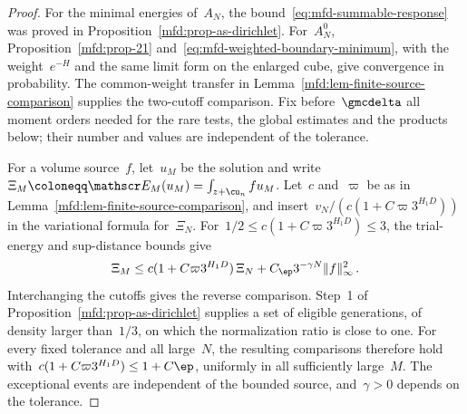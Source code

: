 \documentclass[11pt]{amsart}
\begin{document}
\begin{proof}
For the minimal energies of~$A_N$, the bound~\eqref{eq:mfd-summable-response} was proved in Proposition~\ref{mfd:prop-as-dirichlet}. For~$A_N^0$, Proposition~\ref{mfd:prop-21} and~\eqref{eq:mfd-weighted-boundary-minimum}, with the weight~$e^{-H}$ and the same limit form on the enlarged cube, give convergence in probability. The common-weight transfer in Lemma~\ref{mfd:lem-finite-source-comparison} supplies the two-cutoff comparison. Fix before~$\gmcdelta$ all moment orders needed for the rare tests, the global estimates and the products below; their number and values are independent of the tolerance.

\smallskip

For a volume source~$f$, let~$u_M$ be the solution and write~$\Xi_M\coloneqq \mathscr E_M(u_M)=\int_{z+\cu_n}fu_M$. Let~$c$ and~$\varpi$ be as in Lemma~\ref{mfd:lem-finite-source-comparison}, and insert~$v_N/(c(1+C\varpi3^{H_1D}))$ in the variational formula for~$\Xi_N$. For~$1/2\leq c(1+C\varpi3^{H_1D})\leq3$, the trial-energy and sup-distance bounds give
\begin{equation*}
	\Xi_M\leq c(1+C\varpi3^{H_1D})\,\Xi_N+C_\ep3^{-\gamma N}\|f\|_\infty^2\,.
\end{equation*}
Interchanging the cutoffs gives the reverse comparison. Step~1 of Proposition~\ref{mfd:prop-as-dirichlet} supplies a set of eligible generations, of density larger than~$1/3$, on which the normalization ratio is close to one. For every fixed tolerance and all large~$N$, the resulting comparisons therefore hold with~$c(1+C\varpi3^{H_1D})\leq1+C\ep$, uniformly in all sufficiently large~$M$. The exceptional events are independent of the bounded source, and~$\gamma>0$ depends on the tolerance.

\smallskip


\end{proof}
\end{document}
